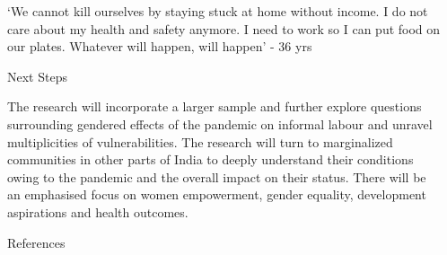 \documentclass[final]{beamer}
\newlength{\sepwidth}
\newlength{\colwidth}
\newcommand{\separatorcolumn}{\begin{column}{\sepwidth}\end{column}}
\begin{document}
\begin{frame}[t]
\begin{columns}[t]
\begin{column}{\colwidth}
  \begin{alertblock}{}

‘We cannot kill ourselves by
staying stuck at home without
income. I do not care about my
health and safety anymore. I
need to work so I can put food
on our plates. Whatever will
happen, will happen’ - 36 yrs
  \end{alertblock}
 

  \begin{block}{Next Steps}

The research will incorporate a
larger sample and further
explore questions surrounding
gendered effects of the
pandemic on informal labour
and unravel multiplicities of
vulnerabilities. The research will
turn to marginalized
communities in other parts of
India to deeply understand their
conditions owing to the
pandemic and the overall
impact on their status. There
will be an emphasised focus on
women empowerment, gender
equality, development
aspirations and health
outcomes.
  \end{block}

  \begin{block}{References}

    \nocite{*}
    \footnotesize{}

  \end{block}

\end{column}
\separatorcolumn

\end{columns}
\end{frame}
\end{document}
